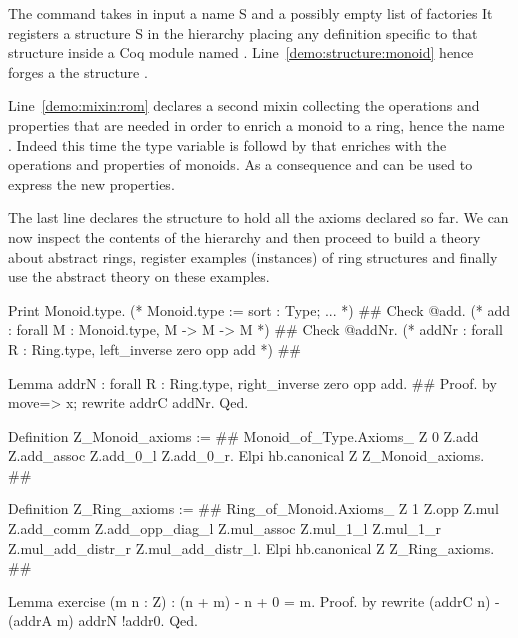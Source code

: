\documentclass[a4paper,UKenglish,cleveref, autoref]{lipics-v2019}
\newcommand{\mixin}{mixin}
\newcommand{\factories}{factories}
\theoremstyle{implem}
\theoremstyle{implem}
\theoremstyle{axiom}
\theoremstyle{abscommand}
\theoremstyle{command}
\begin{document}
The  command takes in input a name S and a possibly
empty list of \factories{}
It registers a structure S in the hierarchy placing
any definition specific to that structure inside a Coq module named .
Line~\ref{demo:structure:monoid} hence forges a the structure .

Line~\ref{demo:mixin:rom} declares a second \mixin{} collecting the operations
and properties that are needed in order to enrich a monoid to a ring, hence
the name . Indeed this time the type variable 
is followd by  that enriches
 with the operations and properties of monoids. As a consequence
 and  can be used to express the new properties.

The last line declares the structure  to hold all the axioms declared
so far. We can now inspect the contents of the hierarchy and then
proceed to build a theory about abstract rings,
register examples (instances) of ring structures
and finally use the abstract theory on these examples.

\begin{coqcode}
Print Monoid.type. (* Monoid.type  :=  { sort : Type;  ... }                           *) #\label{demo:theory:print:type}#
Check @add.        (* add          :   forall M : Monoid.type, M -> M -> M             *) #\label{demo:theory:check:add}#
Check @addNr.      (* addNr        :   forall R : Ring.type, left_inverse zero opp add *) #\label{demo:theory:check:addNr}#

Lemma addrN : forall R : Ring.type, right_inverse zero opp add.                 #\label{demo:theory:state:addrN}#
Proof. by move=> x; rewrite addrC addNr. Qed.

Definition Z_Monoid_axioms :=                                                   #\label{demo:theory:z:monoid:axioms}#
  Monoid_of_Type.Axioms_ Z 0 Z.add
    Z.add_assoc Z.add_0_l Z.add_0_r.
Elpi hb.canonical Z Z_Monoid_axioms.                                            #\label{demo:theory:z:monoid:canonical}#

Definition Z_Ring_axioms :=                                                     #\label{demo:theory:z:ring:axioms}#
  Ring_of_Monoid.Axioms_ Z 1 Z.opp Z.mul
    Z.add_comm Z.add_opp_diag_l Z.mul_assoc Z.mul_1_l Z.mul_1_r
    Z.mul_add_distr_r Z.mul_add_distr_l.
Elpi hb.canonical Z Z_Ring_axioms.                                              #\label{demo:theory:z:ring:canonical}#

Lemma exercise (m n : Z) : (n + m) - n + 0 = m.
Proof. by rewrite (addrC n) -(addrA m) addrN !addr0. Qed.
\end{coqcode}
\end{document}
